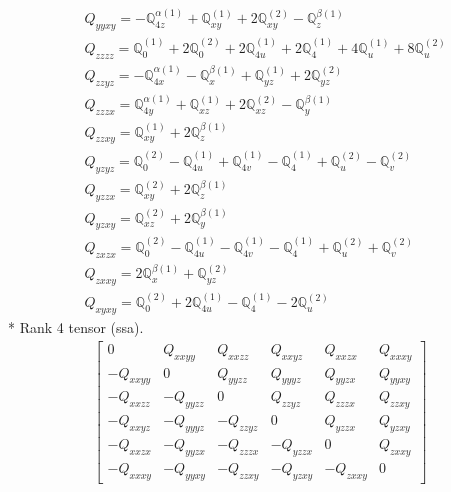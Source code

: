 \documentclass[fleqn,8pt,landscape]{jsarticle}
\begin{document}
\begin{align*}
& Q_{yyxy} = - \mathbb{Q}_{4z}^{\alpha(1)} + \mathbb{Q}_{xy}^{(1)} + 2 \mathbb{Q}_{xy}^{(2)} - \mathbb{Q}_{z}^{\beta(1)} \\
& Q_{zzzz} = \mathbb{Q}_{0}^{(1)} + 2 \mathbb{Q}_{0}^{(2)} + 2 \mathbb{Q}_{4u}^{(1)} + 2 \mathbb{Q}_{4}^{(1)} + 4 \mathbb{Q}_{u}^{(1)} + 8 \mathbb{Q}_{u}^{(2)} \\
& Q_{zzyz} = - \mathbb{Q}_{4x}^{\alpha(1)} - \mathbb{Q}_{x}^{\beta(1)} + \mathbb{Q}_{yz}^{(1)} + 2 \mathbb{Q}_{yz}^{(2)} \\
& Q_{zzzx} = \mathbb{Q}_{4y}^{\alpha(1)} + \mathbb{Q}_{xz}^{(1)} + 2 \mathbb{Q}_{xz}^{(2)} - \mathbb{Q}_{y}^{\beta(1)} \\
& Q_{zzxy} = \mathbb{Q}_{xy}^{(1)} + 2 \mathbb{Q}_{z}^{\beta(1)} \\
& Q_{yzyz} = \mathbb{Q}_{0}^{(2)} - \mathbb{Q}_{4u}^{(1)} + \mathbb{Q}_{4v}^{(1)} - \mathbb{Q}_{4}^{(1)} + \mathbb{Q}_{u}^{(2)} - \mathbb{Q}_{v}^{(2)} \\
& Q_{yzzx} = \mathbb{Q}_{xy}^{(2)} + 2 \mathbb{Q}_{z}^{\beta(1)} \\
& Q_{yzxy} = \mathbb{Q}_{xz}^{(2)} + 2 \mathbb{Q}_{y}^{\beta(1)} \\
& Q_{zxzx} = \mathbb{Q}_{0}^{(2)} - \mathbb{Q}_{4u}^{(1)} - \mathbb{Q}_{4v}^{(1)} - \mathbb{Q}_{4}^{(1)} + \mathbb{Q}_{u}^{(2)} + \mathbb{Q}_{v}^{(2)} \\
& Q_{zxxy} = 2 \mathbb{Q}_{x}^{\beta(1)} + \mathbb{Q}_{yz}^{(2)} \\
& Q_{xyxy} = \mathbb{Q}_{0}^{(2)} + 2 \mathbb{Q}_{4u}^{(1)} - \mathbb{Q}_{4}^{(1)} - 2 \mathbb{Q}_{u}^{(2)}
\end{align*}
* Rank 4 tensor (ssa).
\begin{align*}
\begin{bmatrix} 0 & Q_{xxyy} & Q_{xxzz} & Q_{xxyz} & Q_{xxzx} & Q_{xxxy} \\ - Q_{xxyy} & 0 & Q_{yyzz} & Q_{yyyz} & Q_{yyzx} & Q_{yyxy} \\ - Q_{xxzz} & - Q_{yyzz} & 0 & Q_{zzyz} & Q_{zzzx} & Q_{zzxy} \\ - Q_{xxyz} & - Q_{yyyz} & - Q_{zzyz} & 0 & Q_{yzzx} & Q_{yzxy} \\ - Q_{xxzx} & - Q_{yyzx} & - Q_{zzzx} & - Q_{yzzx} & 0 & Q_{zxxy} \\ - Q_{xxxy} & - Q_{yyxy} & - Q_{zzxy} & - Q_{yzxy} & - Q_{zxxy} & 0 \end{bmatrix}
\end{align*}
\end{document}
